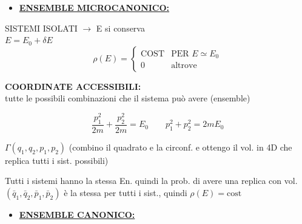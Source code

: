 \documentclass[12pt,a4paper]{article}
\begin{document}
\newpage
\begin{itemize}
    \item \underline{\textbf{ENSEMBLE MICROCANONICO:}}
\end{itemize}

SISTEMI ISOLATI $\rightarrow$ E si conserva \\
$E = E_0 + \delta E$
\begin{equation*}
    \rho(E) = \begin{cases} 
        \text{COST} & \text{PER } E \simeq E_0 \\
        0 & \text{altrove}
    \end{cases}
\end{equation*}

\vspace{0.5cm}


\noindent \textbf{COORDINATE ACCESSIBILI:} \\
tutte le possibili combinazioni che il sistema può avere (ensemble)

\vspace{0.5cm}
\begin{equation*}
    \frac{p_1^2}{2m} + \frac{p_2^2}{2m} = E_0 \qquad p_1^2 + p_2^2 = 2mE_0
\end{equation*}


$\Gamma(q_1, q_2, p_1, p_2)$ (combino il quadrato e la circonf. e ottengo il vol. in 4D che replica tutti i sist. possibili)

\vspace{0.3cm}
Tutti i sistemi hanno la stessa En. quindi la prob. di avere una replica con vol. $(\bar{q}_1, \bar{q}_2, \bar{p}_1, \bar{p}_2)$ è la stessa per tutti i sist., quindi $\rho(E) = \text{cost}$

\vspace{0.8cm}
\begin{itemize}
    \item \underline{\textbf{ENSEMBLE CANONICO:}}
\end{itemize}
\end{document}
